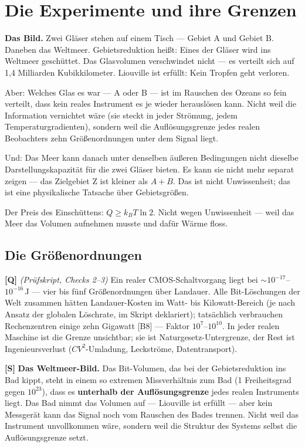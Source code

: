 \section{Die Experimente und ihre Grenzen}
\label{sec:experimente}

\textbf{Das Bild.} Zwei Gläser stehen auf einem Tisch --- Gebiet A und Gebiet B.
Daneben das Weltmeer. Gebietsreduktion heißt: Eines der Gläser wird ins Weltmeer
geschüttet. Das Glasvolumen verschwindet nicht --- es verteilt sich auf 1,4
Milliarden Kubikkilometer. Liouville ist erfüllt: Kein Tropfen geht verloren.

Aber: Welches Glas es war --- A oder B --- ist im Rauschen des Ozeans so fein
verteilt, dass kein reales Instrument es je wieder herauslösen kann. Nicht weil
die Information vernichtet wäre (sie steckt in jeder Strömung, jedem
Temperaturgradienten), sondern weil die Auflösungsgrenze jedes realen Beobachters
zehn Größenordnungen unter dem Signal liegt.

Und: Das Meer kann danach unter denselben äußeren Bedingungen nicht dieselbe
Darstellungskapazität für die zwei Gläser bieten. Es kann sie nicht mehr separat
zeigen --- das Zielgebiet Z ist kleiner als $A+B$. Das ist nicht Unwissenheit; das
ist eine physikalische Tatsache über Gebietsgrößen.

Der Preis des Einschüttens: $Q \ge k_B T \ln 2$. Nicht wegen Unwissenheit ---
weil das Meer das Volumen aufnehmen musste und dafür Wärme floss.

\subsection{Die Größenordnungen}

\textbf{[Q]} \emph{(Prüfskript, Checks 2--3)} Ein realer CMOS-Schaltvorgang liegt bei
${\sim}10^{-17}$--$10^{-16}$\,J --- vier bis fünf Größenordnungen über Landauer.
Alle Bit-Löschungen der Welt zusammen hätten Landauer-Kosten im Watt- bis
Kilowatt-Bereich (je nach Ansatz der globalen Löschrate, im Skript deklariert);
tatsächlich verbrauchen Rechenzentren einige zehn Gigawatt [B8] --- Faktor
$10^{7}$--$10^{10}$. In jeder realen Maschine ist die Grenze unsichtbar; sie ist
Naturgesetz-Untergrenze, der Rest ist Ingenieursverlust
($CV^2$-Umladung, Leckströme, Datentransport).

\textbf{[S]} \textbf{Das Weltmeer-Bild.} Das Bit-Volumen, das bei der Gebietsreduktion ins
Bad kippt, steht in einem so extremen Missverhältnis zum Bad (1 Freiheitsgrad
gegen $10^{23}$), dass es \textbf{unterhalb der Auflösungsgrenze} jedes realen
Instruments liegt. Das Bad nimmt das Volumen auf --- Liouville ist erfüllt ---
aber kein Messgerät kann das Signal noch vom Rauschen des Bades trennen. Nicht
weil das Instrument unvollkommen wäre, sondern weil die Struktur des Systems
selbst die Auflösungsgrenze setzt.

